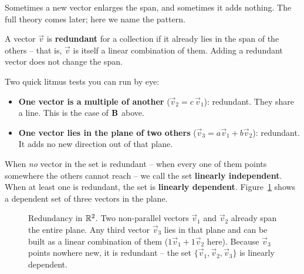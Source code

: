 Sometimes a new vector enlarges the span, and sometimes it adds nothing. The full theory comes later; here we name the pattern.

\begin{definition}\label{ch03:def-redundant}
A vector $\vec{v}$ is \textbf{redundant} for a collection if it already lies in the span of the others -- that is, $\vec{v}$ is itself a linear combination of them. Adding a redundant vector does not change the span.
\end{definition}

Two quick litmus tests you can run by eye:

\begin{itemize}
  \item \textbf{One vector is a multiple of another} ($\vec{v}_2 = c\,\vec{v}_1$): redundant. They share a line. This is the case of $\mathbf{B}$ above.
  \item \textbf{One vector lies in the plane of two others} ($\vec{v}_3 = a\vec{v}_1 + b\vec{v}_2$): redundant. It adds no new direction out of that plane.
\end{itemize}

When \emph{no} vector in the set is redundant -- when every one of them points somewhere the others cannot reach -- we call the set \textbf{linearly independent}. When at least one is redundant, the set is \textbf{linearly dependent}. Figure~\ref{ch03:redundancy-r2} shows a dependent set of three vectors in the plane.

\begin{figure}[H]
\centering
{}
\caption{Redundancy in $\mathbb{R}^2$. Two non-parallel vectors $\vec{v}_1$ and $\vec{v}_2$ already span the entire plane. Any third vector $\vec{v}_3$ lies in that plane and can be built as a linear combination of them ($1\vec{v}_1 + 1\vec{v}_2$ here). Because $\vec{v}_3$ points nowhere new, it is redundant -- the set $\{\vec{v}_1,\vec{v}_2,\vec{v}_3\}$ is linearly dependent.}
\label{ch03:redundancy-r2}
\end{figure}

